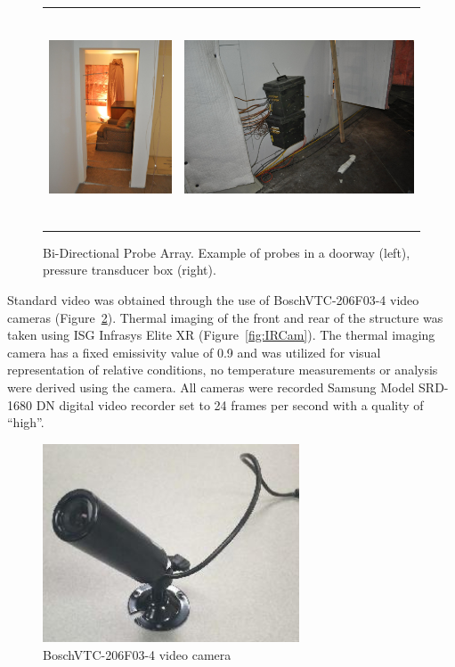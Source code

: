\documentclass[12pt,oneside]{book}
\begin{document}
\begin{figure}[H]
	\centering
	\begin{tabular}{c c}
		\includegraphics[height = 2.5in]{0_Images/Instrumentation/BDPArray.jpg} &
		\includegraphics[height = 2.5in]{0_Images/Instrumentation/PressureBox.jpg} \\
	\end{tabular}
	\caption{Bi-Directional Probe Array. Example of probes in a doorway (left), pressure transducer box (right).}
	\label{fig:BDP}
\end{figure}

Standard video was obtained through the use of BoschVTC-206F03-4 video cameras (Figure~\ref{fig:BullettCam}). Thermal imaging of the front and rear of the structure was taken using ISG Infrasys Elite XR (Figure~\ref{fig:IRCam}). The thermal imaging camera has a fixed emissivity value of 0.9 and was utilized for visual representation of relative conditions, no temperature measurements or analysis were derived using the camera. All cameras were recorded Samsung Model SRD-1680 DN digital video recorder set to 24 frames per second with a quality of ``high''.

\begin{figure}[H]
	\centering
	\includegraphics[width = 3in]{0_Images/Instrumentation/BullettCam.jpg}

	\caption{BoschVTC-206F03-4 video camera}
	\label{fig:BullettCam}
\end{figure}
\end{document}
